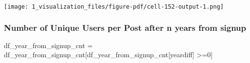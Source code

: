 \documentclass[
  letterpaper,
  DIV=11,
  numbers=noendperiod]{scrartcl}
\newenvironment{Shaded}{\begin{snugshade}}{\end{snugshade}}
\newcommand{\DecValTok}[1]{\textcolor[rgb]{0.68,0.00,0.00}{#1}}
\newcommand{\NormalTok}[1]{\textcolor[rgb]{0.00,0.23,0.31}{#1}}
\newcommand{\OperatorTok}[1]{\textcolor[rgb]{0.37,0.37,0.37}{#1}}
\newcommand{\StringTok}[1]{\textcolor[rgb]{0.13,0.47,0.30}{#1}}
\begin{document}
\texttt{[image: 1\_visualization\_files/figure-pdf/cell-152-output-1.png]}

\subsubsection{Number of Unique Users per Post after n years from
signup}\label{number-of-unique-users-per-post-after-n-years-from-signup}

\begin{Shaded}
\begin{Highlighting}[]
\NormalTok{df\_year\_from\_signup\_cnt }\OperatorTok{=}\NormalTok{ df\_year\_from\_signup\_cnt[df\_year\_from\_signup\_cnt[}\StringTok{\textquotesingle{}yeardiff\textquotesingle{}}\NormalTok{] }\OperatorTok{\textgreater{}=}\DecValTok{0}\NormalTok{]}
\end{Highlighting}
\end{Shaded}
\end{document}
